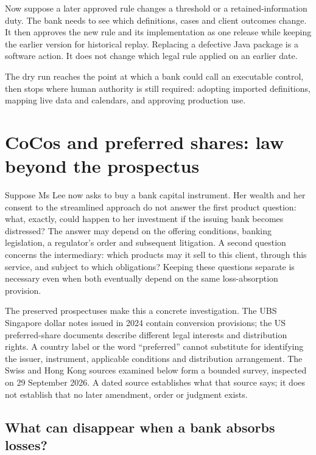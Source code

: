 \documentclass[12pt,a4paper,oneside,openany]{book}
\begin{document}
Now suppose a later approved rule changes a threshold or a retained-information
duty. The bank needs to see which definitions, cases and client outcomes change.
It then approves the new rule and its implementation as one release while
keeping the earlier version for historical replay. Replacing a defective Java
package is a software action. It does not change which legal rule applied on an
earlier date.

The dry run reaches the point at which a bank could call an executable control,
then stops where human authority is still required: adopting imported
definitions, mapping live data and calendars, and approving production use.

\section{CoCos and preferred shares: law beyond the prospectus}
\label{sec:coco-legal-risk}

Suppose Ms Lee now asks to buy a bank capital instrument. Her wealth and her
consent to the streamlined approach do not answer the first product question:
what, exactly, could happen to her investment if the issuing bank becomes
distressed? The answer may depend on the offering conditions, banking legislation,
a regulator's order and subsequent litigation. A second question concerns the
intermediary: which products may it sell to this client, through this service,
and subject to which obligations? Keeping these questions separate is necessary
even when both eventually depend on the same loss-absorption provision.

The preserved prospectuses make this a concrete investigation. The UBS Singapore
dollar notes issued in 2024 contain conversion provisions; the US preferred-share
documents describe different legal interests and distribution rights. A country
label or the word ``preferred'' cannot substitute for identifying the issuer,
instrument, applicable conditions and distribution arrangement. The Swiss and
Hong Kong sources examined below form a bounded survey, inspected on
29 September 2026. A dated source establishes what that source says; it does not
establish that no later amendment, order or judgment exists.

\subsection{What can disappear when a bank absorbs losses?}
\end{document}
